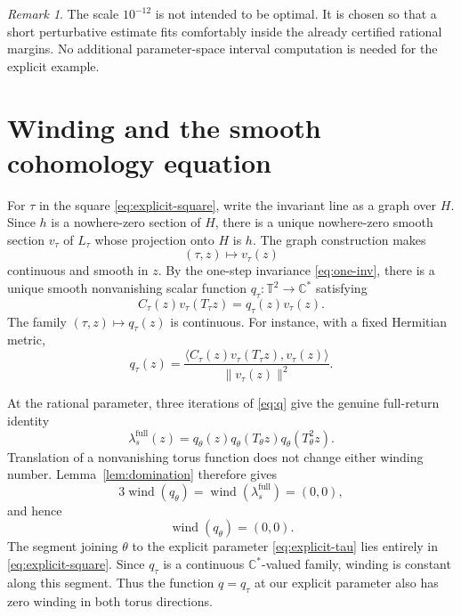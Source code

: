 \documentclass[11pt]{amsart}
\theoremstyle{remark}
\newtheorem{remark}[theorem]{Remark}
\newcommand{\C}{\mathbb C}
\newcommand{\T}{\mathbb T}
\newcommand{\wind}{\operatorname{wind}}
\begin{document}
\begin{remark}\label{rem:why-explicit}
The scale $10^{-12}$ is not intended to be optimal.  It is chosen so that a
short perturbative estimate fits comfortably inside the already certified
rational margins.  No additional parameter-space interval computation is
needed for the explicit example.
\end{remark}

\section{Winding and the smooth cohomology equation}\label{sec:cohomology}

For $\tau$ in the square \eqref{eq:explicit-square}, write the invariant line
as a graph over $H$.  Since $h$ is a nowhere-zero section of $H$, there is a
unique nowhere-zero smooth section $v_\tau$ of $L_\tau$ whose projection onto
$H$ is $h$.  The graph construction makes
\[
 (\tau,z)\longmapsto v_\tau(z)
\]
continuous and smooth in $z$.  By the one-step invariance
\eqref{eq:one-inv}, there is a unique smooth nonvanishing scalar function
$q_\tau:\T^2\to\C^*$ satisfying
\begin{equation}\label{eq:q}
 C_\tau(z)v_\tau(T_\tau z)=q_\tau(z)v_\tau(z).
\end{equation}
The family $(\tau,z)\mapsto q_\tau(z)$ is continuous.  For instance, with a
fixed Hermitian metric,
\[
 q_\tau(z)=
 \frac{\langle C_\tau(z)v_\tau(T_\tau z),v_\tau(z)\rangle}
      {\|v_\tau(z)\|^2}.
\]

At the rational parameter, three iterations of \eqref{eq:q} give the genuine
full-return identity
\begin{equation}\label{eq:q-product}
 \lambda_s^{\mathrm{full}}(z)
 =q_\theta(z)q_\theta(T_\theta z)q_\theta(T_\theta^2z).
\end{equation}
Translation of a nonvanishing torus function does not change either winding
number.  Lemma~\ref{lem:domination} therefore gives
\[
 3\wind(q_\theta)=\wind(\lambda_s^{\mathrm{full}})=(0,0),
\]
and hence
\begin{equation}\label{eq:qtheta-winding}
 \wind(q_\theta)=(0,0).
\end{equation}
The segment joining $\theta$ to the explicit parameter
\eqref{eq:explicit-tau} lies entirely in \eqref{eq:explicit-square}.  Since
$q_\tau$ is a continuous $\C^*$-valued family, winding is constant along this
segment.  Thus the function $q=q_\tau$ at our explicit parameter also has
zero winding in both torus directions.
\end{document}
